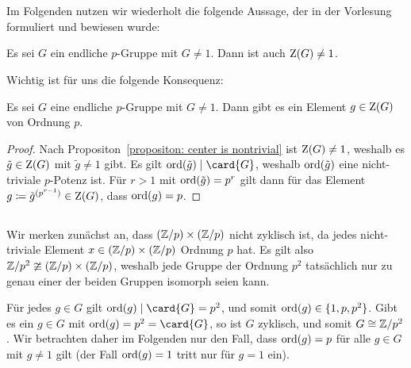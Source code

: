 \section{}

Im Folgenden nutzen wir wiederholt die folgende Aussage, der in der Vorlesung formuliert und bewiesen wurde:

\begin{proposition}
  \label{propositon: center is nontrivial}
  Es sei $G$ ein endliche $p$-Gruppe mit $G \neq 1$.
  Dann ist auch $\operatorname{Z}(G) \neq 1$.
\end{proposition}

Wichtig ist für uns die folgende Konsequenz:

\begin{corollary}
  \label{corollary: center contains an element of order p}
  Es sei $G$ eine endliche $p$-Gruppe mit $G \neq 1$.
  Dann gibt es ein Element $g \in \operatorname{Z}(G)$ von Ordnung $p$.
\end{corollary}

\begin{proof}
  Nach Propositon~\ref{propositon: center is nontrivial} ist $\operatorname{Z}(G) \neq 1$, weshalb es $\tilde{g} \in \operatorname{Z}(G)$ mit $\tilde{g} \neq 1$ gibt.
  Es gilt $\ord{\tilde{g}} \divides \card{G}$, weshalb $\operatorname{ord}(\tilde{g})$ eine nicht-triviale $p$-Potenz ist.
  Für $r > 1$ mit $\operatorname{ord}(\tilde{g}) = p^r$ gilt dann für das Element $g \coloneqq \tilde{g}^{(p^{r-1})} \in \operatorname{Z}(G)$, dass $\operatorname{ord}(g) = p$.
\end{proof}




\addtocounter{subsection}{1}





\subsection{}

Wir merken zunächst an, dass $(\mathbb{Z}/p) \times (\mathbb{Z}/p)$ nicht zyklisch ist, da jedes nicht-triviale Element $x \in (\mathbb{Z}/p) \times (\mathbb{Z}/p)$ Ordnung $p$ hat.
Es gilt also $\mathbb{Z}/p^2 \ncong (\mathbb{Z}/p) \times (\mathbb{Z}/p)$, weshalb jede Gruppe der Ordnung $p^2$ tatsächlich nur zu genau einer der beiden Gruppen isomorph seien kann.

Für jedes $g \in G$ gilt $\ord{g} \divides \card{G} = p^2$, und somit $\operatorname{ord}(g) \in \{1, p, p^2\}$.
Gibt es ein $g \in G$ mit $\ord{g} = p^2 = \card{G}$, so ist $G$ zyklisch, und somit $G \cong \mathbb{Z}/p^2$.
Wir betrachten daher im Folgenden nur den Fall, dass $\operatorname{ord}(g) = p$ für alle $g \in G$ mit $g \neq 1$ gilt (der Fall $\operatorname{ord}(g) = 1$ tritt nur für $g = 1$ ein).

